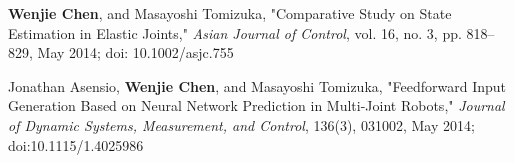 \documentclass[UTF8,fontset=none]{res}
\begin{document}
\begin{resume}
\begin{etaremune}[start=8]
    \item \textbf{Wenjie Chen}, and Masayoshi Tomizuka, "Comparative Study on State Estimation in Elastic Joints," \emph{Asian Journal of Control}, vol. 16, no. 3, pp. 818--829, May 2014; doi: 10.1002/asjc.755%
    \item Jonathan Asensio, \textbf{Wenjie Chen}, and Masayoshi Tomizuka, "Feedforward Input Generation Based on Neural Network Prediction in Multi-Joint Robots," \emph{Journal of Dynamic Systems, Measurement, and Control}, 136(3), 031002, May 2014;   doi:10.1115/1.4025986
    \end{etaremune}


\end{resume}
\end{document}
